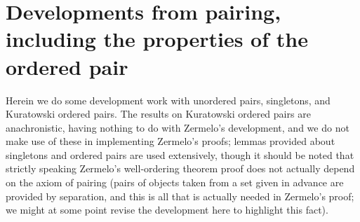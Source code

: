 \documentclass[12pt]{article}
\begin{document}
\section{Developments from pairing, including the properties of the ordered pair}

Herein we do some development work with unordered pairs, singletons, and Kuratowski ordered pairs.  The results on Kuratowski ordered pairs are anachronistic, having nothing to do with Zermelo's development, and we do not make use  of these in implementing Zermelo's proofs;  lemmas provided about singletons and ordered pairs are used extensively, though it should be noted that strictly speaking Zermelo's well-ordering theorem proof does not actually depend on the axiom of pairing (pairs of objects taken from a set given in advance are provided by separation, and this is all that is actually needed in Zermelo's proof;  we might at some point revise the development here to highlight this fact).
\end{document}
